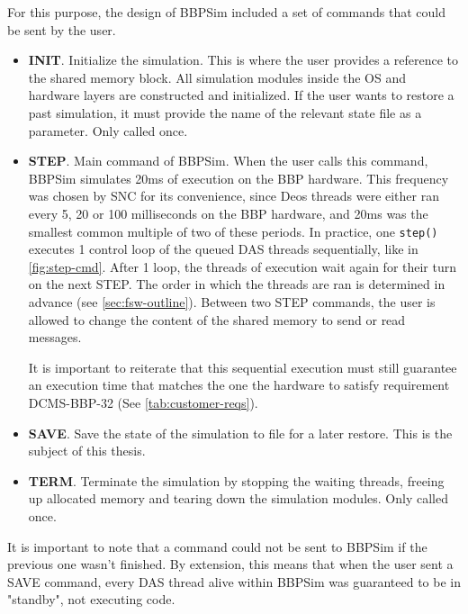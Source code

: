 {For this purpose, the design of BBPSim included a set of commands that could be sent by the user. 
\begin{itemize}
	\item \textbf{INIT}. Initialize the simulation. This is where the user provides a reference to the shared memory block. All simulation modules inside the OS and hardware layers are constructed and initialized. If the user wants to restore a past simulation, it must provide the name of the relevant state file as a parameter. Only called once.
	\item \textbf{STEP}. Main command of BBPSim. When the user calls this command, BBPSim simulates 20ms of execution on the BBP hardware. This frequency was chosen by \gls{SNC} for its convenience, since Deos threads were either ran every 5, 20 or 100 milliseconds on the BBP hardware, and 20ms was the smallest common multiple of two of these periods.  In practice, one \texttt{step()} executes 1 control loop of the queued DAS threads sequentially, like in \autoref{fig:step-cmd}. After 1 loop, the threads of execution wait again for their turn on the next STEP. The order in which the threads are ran is determined in advance (see \autoref{sec:fsw-outline}). Between two STEP commands, the user is allowed to change the content of the shared memory to send or read messages. \par
	\begin{minipage}{\linewidth}
		\vspace{12pt}
		\centering
		
		\label{fig:step-cmd}
		\vspace{12pt}
	\end{minipage}
	It is important to reiterate that this sequential execution must still guarantee an execution time that matches the one the hardware to satisfy requirement DCMS-BBP-32 (See \autoref{tab:customer-reqs}).
	\item \textbf{SAVE}. Save the state of the simulation to file for a later restore. This is the subject of this thesis. 
	\item \textbf{TERM}. Terminate the simulation by stopping the waiting threads, freeing up allocated memory and tearing down the simulation modules. Only called once.
\end{itemize}
It is important to note that a command could not be sent to BBPSim if the previous one wasn't finished. By extension, this means that when the user sent a SAVE command, every DAS thread alive within BBPSim was guaranteed to be in "standby", not executing code. 

}
